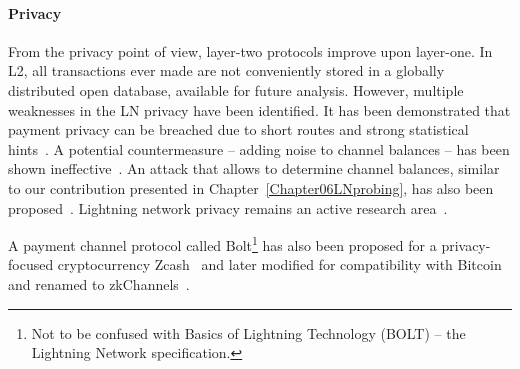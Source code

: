 \paragraph{Privacy}
From the privacy point of view, layer-two protocols improve upon layer-one.
In L2, all transactions ever made are not conveniently stored in a globally distributed open database, available for future analysis.
However, multiple weaknesses in the LN privacy have been identified.
It has been demonstrated that payment privacy can be breached due to short routes and strong statistical hints~\cite{Beres2019}.
A potential countermeasure -- adding noise to channel balances -- has been shown ineffective~\cite{Tang2019}.
An attack that allows to determine channel balances, similar to our contribution presented in Chapter~\ref{Chapter06LNprobing}, has also been proposed~\cite{HerreraJoancomarti2019}.
Lightning network privacy remains an active research area~\cite{Malavolta2017, Kohen2019, Tang2020, Rohrer2020, Kappos2020}.

A payment channel protocol called Bolt\footnote{Not to be confused with Basics of Lightning Technology (BOLT) -- the Lightning Network specification.} has also been proposed for a privacy-focused cryptocurrency Zcash~\cite{Green2017} and later modified for compatibility with Bitcoin and renamed to zkChannels~\cite{Akinyele2020}.

